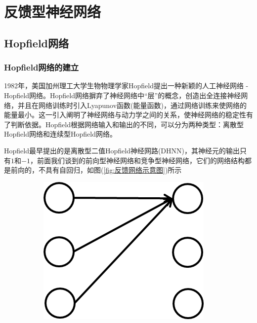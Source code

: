 {\section{反馈型神经网络}
    \subsection{Hopfield网络}
        \subsubsection{Hopfield网络的建立}
            \par
            1982年，美国加州理工大学生物物理学家Hopfield提出一种新颖的人工神经网络 - Hopfield网络。Hopfield网络摒弃了神经网络中“层”的概念，创造出全连接神经网络，并且在网络训练时引入Lyapunov函数(能量函数)，通过网络训练来使网络的能量最小。这一引入阐明了神经网络与动力学之间的关系，使神经网络的稳定性有了判断依据。Hopfield根据网络输入和输出的不同，可以分为两种类型：离散型Hopfield网络和连续型Hopfield网络。
            \par
            Hopfield最早提出的是离散型二值Hopfield神经网路(DHNN)，其神经元的输出只有$1$和$-1$，前面我们谈到的前向型神经网络和竞争型神经网络，它们的网络结构都是前向的，不具有自回归，如图(\ref{fig:反馈网络示意图})所示
   			\begin{figure}[H]
    			\centering
    			\begin{subfigure}[b]{0.2\textwidth}
        			\includegraphics[width=\textwidth]{images/feedback_network1.jpg}

\end{subfigure}
\end{figure}}
